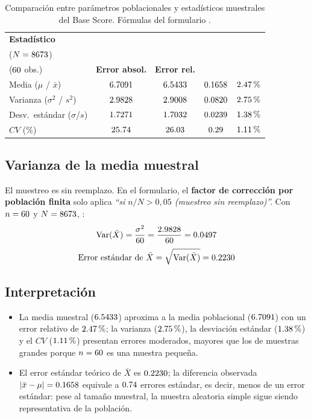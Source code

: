 \documentclass[11pt,a4paper]{article}
\newcommand{\FP}{\text{[F]}}
\begin{document}
\begin{table}[h!]
\centering
\caption{Comparación entre parámetros poblacionales y estadísticos muestrales
del Base Score. Fórmulas del formulario \FP.}
\medskip
\begin{tabular}{@{}lcccc@{}}
\toprule
\textbf{Estadístico} &
\makecell[c]{\textbf{Poblacional}\\($N=8673$)} &
\makecell[c]{\textbf{Muestral}\\($60$ obs.)} &
\textbf{Error absol.} & \textbf{Error rel.} \\
\midrule
Media ($\mu$ / $\bar{x}$)    & $6.7091$ & $6.5433$ & $0.1658$ & $2.47\,\text{\%}$ \\
Varianza ($\sigma^2$ / $s^2$) & $2.9828$   & $2.9008$   & $0.0820$   & $2.75\,\text{\%}$   \\
Desv.\ estándar ($\sigma$/$s$)& $1.7271$   & $1.7032$    & $0.0239$    & $1.38\,\text{\%}$    \\
$CV$ (\%)                    & $25.74$    & $26.03$    & $0.29$    & $1.11\,\text{\%}$    \\
\bottomrule
\end{tabular}
\end{table}

\subsection{Varianza de la media muestral}

El muestreo es sin reemplazo. En el formulario, el \textbf{factor de
corrección por población finita} solo aplica
\emph{``si $n/N > 0{,}05$ (muestreo sin reemplazo)''.}
Con $n=60$ y $N=8673$, \CondicionFPC:
\[
\operatorname{Var}(\bar{X}) = \frac{\sigma^{2}}{60} = \frac{2.9828}{60} = 0.0497
\]
\[
\text{Error estándar de }\bar{X} = \sqrt{\operatorname{Var}(\bar{X})} = 0.2230
\]

\subsection{Interpretación}

\begin{itemize}
  \item La media muestral ($6.5433$) aproxima a la media poblacional
        ($6.7091$) con un error relativo de $2.47\,\text{\%}$; la
        varianza ($2.75\,\text{\%}$), la desviación estándar
        ($1.38\,\text{\%}$) y el $CV$ ($1.11\,\text{\%}$) presentan
        errores moderados, mayores que los de muestras grandes porque
        $n=60$ es una muestra pequeña.
  \item El error estándar teórico de $\bar X$ es $0.2230$; la diferencia
        observada $|\bar{x}-\mu|=0.1658$ equivale a $0.74$ errores
        estándar, es decir, menos de un error estándar: pese al tamaño
        muestral, la muestra aleatoria simple sigue siendo representativa de
        la población.
\end{itemize}
\end{document}
